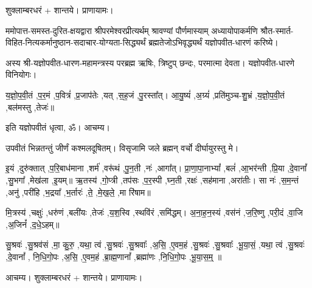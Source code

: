 शुक्लाम्बरधरं + शान्तये। प्राणायामः।

ममोपात्त-समस्त-दुरित-क्षयद्वारा श्रीपरमेश्वरप्रीत्यर्थम् श्रावण्यां पौर्णमास्याम् अध्यायोपाकर्मणि
श्रौत-स्मार्त-विहित-नित्यकर्मानुष्ठान-सदाचार-योग्यता-सिद्ध्यर्थं
ब्रह्मतेजो\-ऽभि\-वृद्ध्यर्थं यज्ञोपवीत-धारणं करिष्ये।

अस्य श्री-यज्ञोपवीत-धारण-महामन्त्रस्य परब्रह्म ऋषिः, त्रिष्टुप् छन्दः, परमात्मा देवता।
यज्ञोपवीत-धारणे विनियोगः।


य॒ज्ञो॒प॒वी॒तं \sep प॒र॒मं \sep प॒वित्रं॑ \sep प्र॒जाप॑तेः \sep यत् \sep स॒ह॒जं \sep पु॒रस्ता᳚त्। आ॒यु॒ष्यं॑ \sep अ॒ग्र्यं॑ \sep प्रति॑मुञ्च-शु॒भ्रं \sep य॒ज्ञो॒प॒वी॒तं \sep बल॑मस्तु \sep तेजः॑॥

इति यज्ञोपवीतं धृत्वा, ॐ। आचम्य।

उपवीतं भिन्नतन्तुं जीर्णं कश्मलदूषितम्। विसृजामि जले ब्रह्मन् वर्चो दीर्घायुरस्तु मे।



इ॒यं \sep दुरु॑क्तात् \sep प॒रि॒बाध॑माना \sep शर्म॑ \sep वरू॑थं \sep पु॒न॒ती \sep नः॑ \sep आगा᳚त्।
प्रा॒णा॒पा॒नाभ्यां᳚ \sep बलं॑ \sep आ॒भर॑न्ती \sep प्रि॒या \sep दे॒वानां᳚ \sep सु॒भगा᳚ \sep मेख॑ला \sep इ॒यम्॥
ऋ॒तस्य॑ \sep गो॒प्त्री \sep तप॑सः \sep प॒र॒स्पी \sep घ्न॒ती \sep रक्षः॑ \sep सह॑माना \sep अरा॑तीः।
सा नः॑ \sep स॒म॒न्तं \sep अनु॑ \sep परी॑हि \sep भ॒द्रया᳚ \sep भ॒र्तारः॑ \sep ते॒ \sep मे॒ख॒ले॒ \sep मा रि॑षाम॥


मि॒त्रस्य॑ \sep चक्षुः॑ \sep धरु॑णं \sep बली॑यः \sep तेजः॑ \sep य॒श॒स्वि \sep स्थवि॑रं \sep समि॑द्धम्।
अ॒ना॒ह॒न॒स्यं \sep वस॑नं \sep ज॒रि॒ष्णु \sep परी॒दं \sep वा॒जि \sep अ॒जिनं᳚ \sep द॒धे॒ऽहम्॥


सु॒श्रवः॑ \sep सु॒श्रव॑सं \sep मा॒ कु॒रु॒ \sep यथा॒ त्वं \sep सु॒श्रवः॑ \sep सु॒श्रवाः᳚ \sep अ॒सि॒ \sep ए॒वम॒हं \sep सु॒श्रवः॑ \sep सु॒श्रवाः᳚ \sep भू॒या॒सं॒ \sep यथा॒ त्वं \sep सु॒श्रवः॑ \sep दे॒वानां᳚ \sep
नि॒धि॒गो॒पः \sep अ॒सि॒ \sep ए॒वम॒हं \sep ब्रा॒ह्म॒णानां᳚ \sep ब्रह्मा॑णः \sep नि॒धि॒गो॒पः \sep भू॒या॒स॒म्॒ ॥


आचम्य। शुक्लाम्बरधरं + शान्तये। प्राणायामः।

